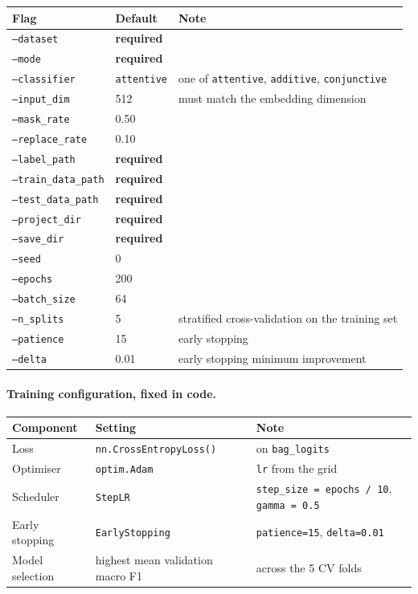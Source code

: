\documentclass[10pt,a4paper]{article}
\newcommand{\req}{\textcolor{eosin}{\textbf{required}}}
\begin{document}
\begin{longtable}{@{}p{4.0cm}p{2.8cm}p{8.8cm}@{}}
\toprule
\textbf{Flag} & \textbf{Default} & \textbf{Note} \\
\midrule \endhead
\texttt{--dataset} & \req & \\
\texttt{--mode} & \req & \\
\texttt{--classifier} & \texttt{attentive} & one of \texttt{attentive}, \texttt{additive}, \texttt{conjunctive} \\
\texttt{--input\_dim} & 512 & must match the embedding dimension \\
\texttt{--mask\_rate} & 0.50 & \\
\texttt{--replace\_rate} & 0.10 & \\
\texttt{--label\_path} & \req & \\
\texttt{--train\_data\_path} & \req & \\
\texttt{--test\_data\_path} & \req & \\
\texttt{--project\_dir} & \req & \\
\texttt{--save\_dir} & \req & \\
\texttt{--seed} & 0 & \\
\texttt{--epochs} & 200 & \\
\texttt{--batch\_size} & 64 & \\
\texttt{--n\_splits} & 5 & stratified cross-validation on the training set \\
\texttt{--patience} & 15 & early stopping \\
\texttt{--delta} & 0.01 & early stopping minimum improvement \\
\bottomrule
\end{longtable}

\paragraph{Training configuration, fixed in code.}

\begin{longtable}{@{}p{4.6cm}p{4.2cm}p{6.8cm}@{}}
\toprule
\textbf{Component} & \textbf{Setting} & \textbf{Note} \\
\midrule \endhead
Loss & \texttt{nn.CrossEntropyLoss()} & on \texttt{bag\_logits} \\
Optimiser & \texttt{optim.Adam} & \texttt{lr} from the grid \\
Scheduler & \texttt{StepLR} & \texttt{step\_size = epochs / 10}, \texttt{gamma = 0.5} \\
Early stopping & \texttt{EarlyStopping} & \texttt{patience=15}, \texttt{delta=0.01} \\
Model selection & highest mean validation macro F1 & across the 5 CV folds \\
\bottomrule
\end{longtable}
\end{document}
